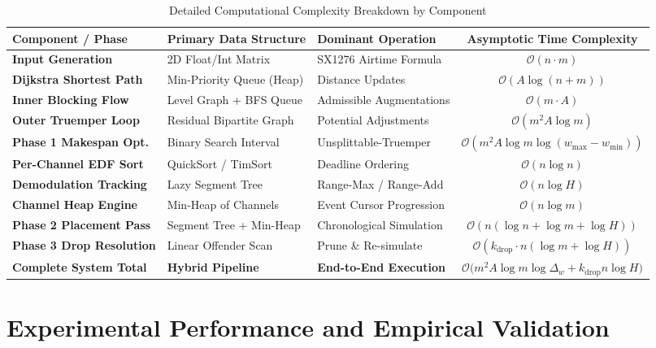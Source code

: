 \documentclass{article}
\begin{document}
\begin{table}[!ht]
\centering
\small
\caption{Detailed Computational Complexity Breakdown by Component}
\label{tab:complexity_breakdown}
\begin{tabular}{|l|l|l|c|}
\hline
\textbf{Component / Phase} & \textbf{Primary Data Structure} & \textbf{Dominant Operation} & \textbf{Asymptotic Time Complexity} \\
\hline
\hline
\textbf{Input Generation} & 2D Float/Int Matrix & SX1276 Airtime Formula & $\mathcal{O}(n \cdot m)$ \\
\hline
\textbf{Dijkstra Shortest Path} & Min-Priority Queue (Heap) & Distance Updates & $\mathcal{O}(A \log(n + m))$ \\
\hline
\textbf{Inner Blocking Flow} & Level Graph + BFS Queue & Admissible Augmentations & $\mathcal{O}(m \cdot A)$ \\
\hline
\textbf{Outer Truemper Loop} & Residual Bipartite Graph & Potential Adjustments & $\mathcal{O}(m^2 A \log m)$ \\
\hline
\textbf{Phase 1 Makespan Opt.} & Binary Search Interval & Unsplittable-Truemper & $\mathcal{O}(m^2 A \log m \log(w_{\max} - w_{\min}))$ \\
\hline
\textbf{Per-Channel EDF Sort} & QuickSort / TimSort & Deadline Ordering & $\mathcal{O}(n \log n)$ \\
\hline
\textbf{Demodulation Tracking} & Lazy Segment Tree & Range-Max / Range-Add & $\mathcal{O}(n \log H)$ \\
\hline
\textbf{Channel Heap Engine} & Min-Heap of Channels & Event Cursor Progression & $\mathcal{O}(n \log m)$ \\
\hline
\textbf{Phase 2 Placement Pass} & Segment Tree + Min-Heap & Chronological Simulation & $\mathcal{O}(n (\log n + \log m + \log H))$ \\
\hline
\textbf{Phase 3 Drop Resolution} & Linear Offender Scan & Prune \& Re-simulate & $\mathcal{O}(k_{\text{drop}} \cdot n (\log m + \log H))$ \\
\hline
\hline
\textbf{Complete System Total} & \textbf{Hybrid Pipeline} & \textbf{End-to-End Execution} & $\mathcal{O}\Big(m^2 A \log m \log \Delta_w + k_{\text{drop}} n \log H\Big)$ \\
\hline
\end{tabular}
\end{table}

\section{Experimental Performance and Empirical Validation}
\label{sec:experiments}
\end{document}
